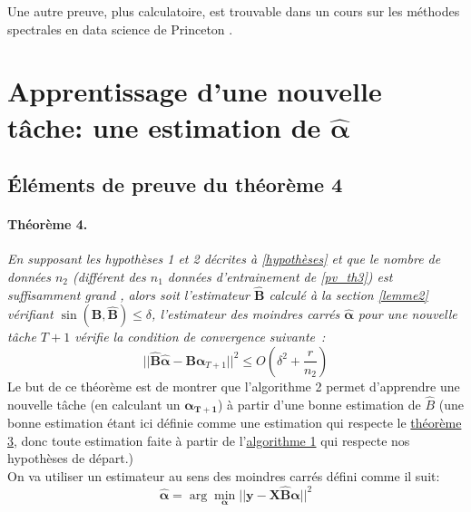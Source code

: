 \documentclass[12pt]{article}
\begin{document}
\noindent Une autre preuve, plus calculatoire, est trouvable dans un cours sur les méthodes spectrales en data science de Princeton \cite{DAVIS_PROOF}.

\section{Apprentissage d'une nouvelle tâche: une estimation de $\hat{\bm{\alpha}}$}
\subsection{Éléments de preuve du théorème 4}\label{th4}
\paragraph*{Théorème 4.} \textit{En supposant les hypothèses 1 et 2 décrites à \ref{hypothèses} et que le nombre de données $n_2$ (différent des $n_1$ données d'entrainement de \ref{pv_th3}) est suffisamment grand \cite{MTLR_1}, alors soit l'estimateur $\bm{\hat{B}}$ calculé à la section \ref{lemme2} vérifiant $\sin(\bm{B}, \bm{\hat{B}}) \leq \delta$, l'estimateur des moindres carrés $\bm{\hat{\alpha}}$ pour une nouvelle tâche $T+1$ vérifie la condition de convergence suivante~:}
$$
\lvert \lvert \bm{\hat{B}\hat{\alpha}} - \bm{B\alpha}_{T+1}\rvert \rvert^2 \leq O\left( \delta^2 + \frac{r}{n_2}\right)
$$
Le but de ce théorème est de montrer que l'algorithme 2 \cite{MTLR_1} permet d'apprendre une nouvelle tâche (en calculant un $\bm{\alpha_{T + 1}}$) à partir d'une bonne estimation de $\hat B$ (une bonne estimation étant ici définie comme une estimation qui respecte le \hyperref[pv_th3]{théorème 3}, donc toute estimation faite à partir de l'\hyperref[algo1]{algorithme 1} qui respecte nos hypothèses de départ.)\\
On va utiliser un estimateur au sens des moindres carrés défini comme il suit:
$$
\hat{\bm \alpha} = \arg\min_{\bm \alpha} \lvert \lvert \textbf{y} - \textbf{X}\hat{\textbf{B}} \bm{\alpha} \rvert \rvert^2
$$
\end{document}
